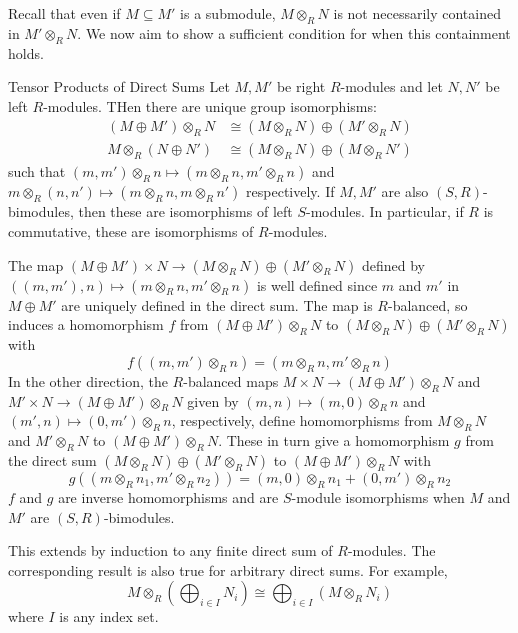 \documentclass[12pt, a4paper, twoside, openright, titlepage]{book}
\begin{document}
Recall that even if $M \subseteq M'$ is a submodule, $M\otimes_R N$ is not necessarily contained in $M'\otimes_R N$. We now aim to show a sufficient condition for when this containment holds.

\begin{thm}{Tensor Products of Direct Sums}{}
    Let $M,M'$ be right $R$-modules and let $N,N'$ be left $R$-modules. THen there are unique group isomorphisms: \begin{align*}
        (M\oplus M')\otimes_R N&\cong (M\otimes_R N)\oplus (M'\otimes_RN)\\
        M\otimes_R(N\oplus N') &\cong (M\otimes_R N)\oplus (M\otimes_RN')
    \end{align*}
    such that $(m,m')\otimes_Rn \mapsto (m\otimes_R n, m'\otimes_R n)$ and $m\otimes_R(n,n')\mapsto (m\otimes_R n,m\otimes_Rn')$ respectively. If $M,M'$ are also $(S,R)$-bimodules, then these are isomorphisms of left $S$-modules. In particular, if $R$ is commutative, these are isomorphisms of $R$-modules.
\end{thm}
\begin{proof*}{}{}
    The map $(M\oplus M')\times N\rightarrow (M\otimes_R N)\oplus (M'\otimes_RN)$ defined by $((m,m'),n)\mapsto (m\otimes_Rn,m'\otimes_Rn)$ is well defined since $m$ and $m'$ in $M\oplus M'$ are uniquely defined in the direct sum. The map is $R$-balanced, so induces a homomorphism $f$ from $(M\oplus M')\otimes_R N$ to $(M\otimes_RN)\oplus(M'\otimes_RN)$ with \begin{equation*}
        f((m,m')\otimes_Rn) = (m\otimes_Rn,m'\otimes_Rn)
    \end{equation*}
    In the other direction, the $R$-balanced maps $M\times N \rightarrow (M\oplus M')\otimes_RN$ and $M'\times N \rightarrow (M\oplus M')\otimes_R N$ given by $(m,n)\mapsto (m,0)\otimes_Rn$ and $(m',n)\mapsto (0,m')\otimes_Rn$, respectively, define homomorphisms from $M\otimes_RN$ and $M'\otimes_RN$ to $(M\oplus M')\otimes_RN$. These in turn give a homomorphism $g$ from the direct sum $(M\otimes_RN)\oplus(M'\otimes_RN)$ to $(M\oplus M')\otimes_RN$ with \begin{equation*}
        g((m\otimes_Rn_1, m'\otimes_Rn_2)) = (m,0)\otimes_Rn_1+(0,m')\otimes_Rn_2
    \end{equation*}
    $f$ and $g$ are inverse homomorphisms and are $S$-module isomorphisms when $M$ and $M'$ are $(S,R)$-bimodules.
\end{proof*}

This extends by induction to any finite direct sum of $R$-modules. The corresponding result is also true for arbitrary direct sums. For example, \begin{equation*}
    M\otimes_R\left(\bigoplus_{i \in I}N_i\right) \cong \bigoplus_{i\in I}(M\otimes_RN_i)
\end{equation*}
where $I$ is any index set.
\end{document}
